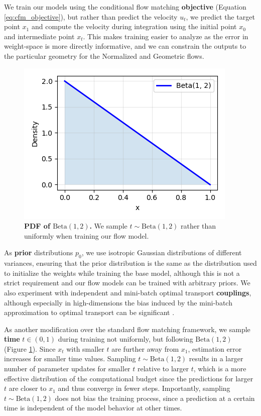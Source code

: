 We train our models using the conditional flow matching \textbf{objective} (Equation \ref{eq:cfm_objective}), but rather than predict the velocity $u_t$, we predict the target point $x_1$ and compute the velocity during integration using the initial point $x_0$ and intermediate point $x_t$. This makes training easier to analyze as the error in weight-space is more directly informative, and we can constrain the outputs to the particular geometry for the Normalized and Geometric flows. 

\begin{figure}
    \centering
        \includegraphics[width=\linewidth]{figures/beta.png}
    \caption{\label{fig:beta}\textbf{PDF of $\text{Beta}(1,2)$.} We sample $t\sim \text{Beta}(1,2)$ rather than uniformly when training our flow model.}
\end{figure}

As \textbf{prior} distributions $p_0$, we use isotropic Gaussian distributions of different variances, ensuring that the prior distribution is the same as the distribution used to initialize the weights while training the base model, although this is not a strict requirement and our flow models can be trained with arbitrary priors. We also experiment with independent and mini-batch optimal transport \textbf{couplings}, although especially in high-dimensions the bias induced by the mini-batch approximation to optimal transport can be significant \citep{fatrasMinibatchOptimalTransport2021}. 

As another modification over the standard flow matching framework, we sample \textbf{time} $t \in (0,1)$  during training not uniformly, but following $\text{Beta}(1,2)$ (Figure \ref{fig:beta}). Since $x_t$ with smaller $t$ are further away from $x_1$, estimation error increases for smaller time values. Sampling $t \sim \text{Beta}(1,2)$ results in a larger number of parameter updates for smaller $t$ relative to larger $t$, which is a more effective distribution of the computational budget since the predictions for larger $t$ are closer to $x_1$ and thus converge in fewer steps. Importantly, sampling $t \sim \text{Beta}(1,2)$ does not bias the training process, since a prediction at a certain time is independent of the model behavior at other times. 

